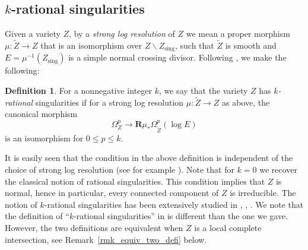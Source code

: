 \documentclass[JEP,XML,SOM,Unicode]{cedram}
\theoremstyle{plain}
\theoremstyle{definition}
\newtheorem{defi}[thm]{Definition}
\newcommand\R{{\mathbf R}}
\newcommand\sing{\mathrm{sing}}
\begin{document}
\subsection{$k$-rational singularities}\label{section_k_rational}
Given a variety $Z$, by a \emph{strong log resolution} of $Z$ we mean a proper morphism
$\mu\colon\widetilde{Z}\to Z$ that is an isomorphism over $Z\smallsetminus Z_\sing$, such that $\widetilde{Z}$ is smooth and
$E=\mu^{-1}(Z_\sing)$ is a simple normal crossing divisor.
Following \cite{FL2}, we make the following:

\begin{defi}
For a nonnegative integer $k$, we say that the variety $Z$ has
\emph{$k$\nobreakdash-ra\-tional} singularities if for a strong log resolution $\mu\colon\widetilde{Z}\to Z$ as above,
the canonical morphism\vspace*{-3pt}\enlargethispage{.5\baselineskip}
\begin{equation}\label{eq_def_k_rat}
\Omega_Z^p\to \R\mu_*\Omega^p_{\widetilde{Z}}(\log E)
\end{equation}
is an isomorphism for $0\leq p\leq k$.
\end{defi}

It is easily seen that the condition in the above definition is independent of the choice of strong log resolution (see for example \cite[Lem.\,1.6]{MP2}).
Note that for $k=0$ we recover the classical notion of rational singularities. This condition implies that $Z$ is normal, hence in particular,
every connected component of $Z$ is irreducible.
The notion of $k$-rational singularities has been extensively studied in \cite{FL2}, \cite{FL3}, \cite{MP2}.
We note that the definition of ``$k$-rational singularities'' in \cite{FL2} is different than the one we gave. However, the two definitions are equivalent
when $Z$ is a local complete intersection, see Remark~\ref{rmk_equiv_two_defi} below.
\end{document}
